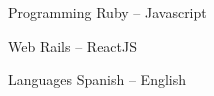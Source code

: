 

\begin{cvskills}

  \cvskill
    {Programming} %
    {Ruby – Javascript} %

  \cvskill
    {Web} %
    {Rails – ReactJS} %

  \cvskill
    {Languages} %
    {Spanish – English} %

\end{cvskills}
